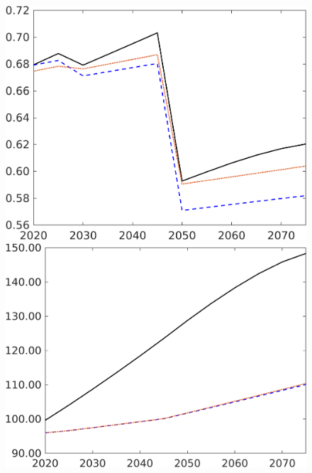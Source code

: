 \begin{figure}[h!!]
\begin{minipage}[]{0.32\textwidth}
	\end{minipage}
	\begin{minipage}[]{0.32\textwidth}
	\includegraphics[width=1\textwidth]{../../codding_model/own_basedOnFried/optimalPol_elastS_DisuSci/figures/all_1705/C_CompEffOPT_T_NoTaus_spillover0_sep1_BN0_ineq0_etaa0.79_lgd0.png}
\end{minipage}
\begin{minipage}[]{0.32\textwidth}
	\includegraphics[width=1\textwidth]{../../codding_model/own_basedOnFried/optimalPol_elastS_DisuSci/figures/all_1705/Ag_CompEffOPT_T_NoTaus_spillover0_sep1_BN0_ineq0_etaa0.79_lgd0.png}

\end{minipage}
\end{figure}
